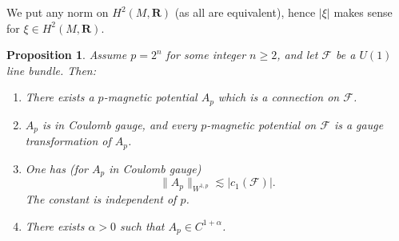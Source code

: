 \documentclass[reqno,11pt]{amsart}
\newcommand{\RR}{\mathbf{R}}
\newtheorem{proposition}[theorem]{Proposition}
\theoremstyle{definition}
\numberwithin{equation}{section}
\begin{document}
We put any norm on $H^2(M, \RR)$ (as all are equivalent), hence $|\xi|$ makes sense for $\xi \in H^2(M, \RR)$.

\begin{proposition}\label{existence for p}
Assume $p = 2^n$ for some integer $n \geq 2$, and let $\mathscr F$ be a $U(1)$ line bundle.
Then:
\begin{enumerate}
\item There exists a $p$-magnetic potential $A_p$ which is a connection on $\mathscr F$.
\item $A_p$ is in Coulomb gauge, and every $p$-magnetic potential on $\mathscr F$ is a gauge transformation of $A_p$.
\item One has (for $A_p$ in Coulomb gauge)
\begin{equation}\label{Sobolev bounds for p}
	\|A_p\|_{W^{1, p}} \lesssim |c_1(\mathscr F)|.
\end{equation}
The constant is independent of $p$.
\item There exists $\alpha > 0$ such that $A_p \in C^{1 + \alpha}$.
\end{enumerate}
\end{proposition}
\end{document}
